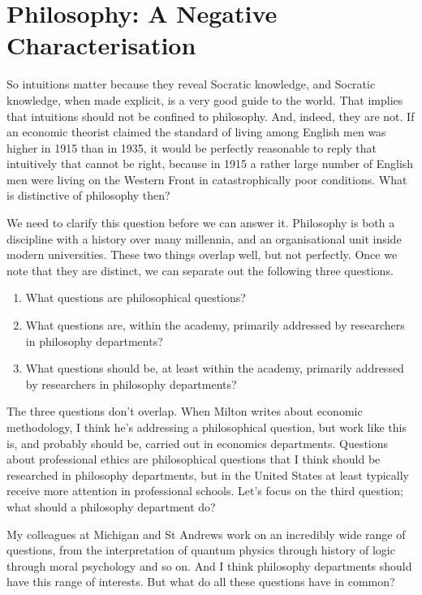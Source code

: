 \section{Philosophy: A Negative Characterisation}
\label{sec:Negative}
So intuitions matter because they reveal Socratic knowledge, and Socratic knowledge, when made explicit, is a very good guide to the world. That implies that intuitions should not be confined to philosophy. And, indeed, they are not. If an economic theorist claimed the standard of living among English men was higher in 1915 than in 1935, it would be perfectly reasonable to reply that intuitively that cannot be right, because in 1915 a rather large number of English men were living on the Western Front in catastrophically poor conditions. What is distinctive of philosophy then?

We need to clarify this question before we can answer it. Philosophy is both a discipline with a history over many millennia, and an organisational unit inside modern universities. These two things overlap well, but not perfectly. Once we note that they are distinct, we can separate out the following three questions.

\begin{enumerate}
\item What questions are philosophical questions?
\item What questions are, within the academy, primarily addressed by researchers in philosophy departments?
\item What questions should be, at least within the academy, primarily addressed by researchers in philosophy departments?
\end{enumerate}

\noindent The three questions don't overlap. When Milton \citet{Friedman1953} writes about economic methodology, I think he's addressing a philosophical question, but work like this is, and probably should be, carried out in economics departments. Questions about professional ethics are philosophical questions that I think should be researched in philosophy departments, but in the United States at least typically receive more attention in professional schools. Let's focus on the third question; what should a philosophy department do?  

My colleagues at Michigan and St Andrews work on an incredibly wide range of questions, from the interpretation of quantum physics through history of logic through moral psychology and so on. And I think philosophy departments should have this range of interests. But what do all these questions have in common?

